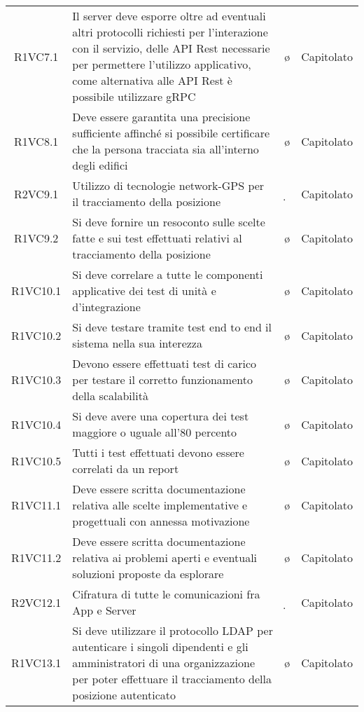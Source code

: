{\begin{longtable}{ c C{4cm} c c}
R1VC7.1 & Il server deve esporre oltre ad eventuali altri protocolli richiesti per l’interazione con il servizio, delle API Rest necessarie per permettere l’utilizzo applicativo, come alternativa alle API Rest è possibile utilizzare gRPC & \o & Capitolato \\
R1VC8.1 & Deve essere garantita una precisione sufficiente affinché si possibile certificare che la persona tracciata sia all’interno degli edifici & \o & Capitolato \\
R2VC9.1 & Utilizzo di tecnologie network-GPS per il tracciamento della posizione & \d & Capitolato \\
R1VC9.2 & Si deve fornire un resoconto sulle scelte fatte e sui test effettuati relativi al tracciamento della posizione & \o & Capitolato \\
R1VC10.1 & Si deve correlare a tutte le componenti applicative dei test di unità e d’integrazione & \o & Capitolato \\
R1VC10.2 & Si deve testare tramite test end to end il sistema nella sua interezza & \o & Capitolato \\
R1VC10.3 & Devono essere effettuati test di carico per testare il corretto funzionamento della scalabilità & \o & Capitolato \\
R1VC10.4 & Si deve avere una copertura dei test maggiore o uguale all’80 percento & \o & Capitolato \\
R1VC10.5 & Tutti i test effettuati devono essere correlati da un report & \o & Capitolato \\
R1VC11.1 & Deve essere scritta documentazione relativa alle scelte implementative e progettuali con annessa motivazione & \o & Capitolato \\
R1VC11.2 & Deve essere scritta documentazione relativa ai problemi aperti e eventuali soluzioni proposte da esplorare & \o & Capitolato \\
R2VC12.1 & Cifratura di tutte le comunicazioni fra App e Server & \d & Capitolato  \\
R1VC13.1 & Si deve utilizzare il protocollo LDAP per autenticare i singoli dipendenti e gli amministratori di una organizzazione per poter effettuare il tracciamento della posizione autenticato & \o & Capitolato \\

\end{longtable}
}